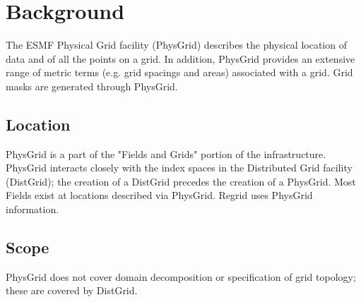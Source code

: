 
\section{Background}

  The ESMF Physical Grid facility (PhysGrid) describes the physical location of
data and of all the points on a grid. In addition, PhysGrid provides an
extensive range of metric terms (e.g. grid spacings and areas) associated with
a grid.  Grid masks are generated through PhysGrid.

\subsection{Location}

  PhysGrid is a part of the "Fields and Grids" portion of the infrastructure.
PhysGrid interacts closely with the index spaces in the Distributed Grid
facility (DistGrid); the creation of a DistGrid precedes the creation of a
PhysGrid.  Most Fields exist at locations described via PhysGrid.  Regrid uses
PhysGrid information.

\subsection{Scope}

PhysGrid does not cover domain decomposition or specification of grid
topology; these are covered by DistGrid.









